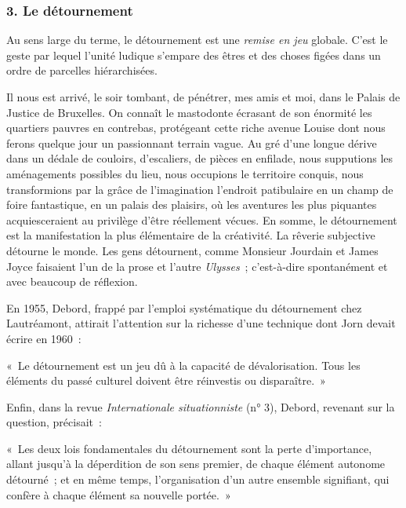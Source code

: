 \documentclass[french,twoside]{book} %
\newenvironment{quoteblock}%
  {\begin{quoting}}
  {\end{quoting}}
\newenvironment{quotebar}{%
    \def\FrameCommand{{\color{rubric!10!}\vrule width 0.5em} \hspace{0.9em}}%
    \def\OuterFrameSep{\itemsep} %
    \MakeFramed {\advance\hsize-\width \FrameRestore}
  }%
  {%
    \endMakeFramed
  }
\renewenvironment{quoteblock}%
  {%
    \savenotes
    \setstretch{0.9}
    \normalfont
    \begin{quotebar}
  }
  {%
    \end{quotebar}
    \spewnotes
  }
\begin{document}
\subsubsection[{3. Le détournement}]{\textsc{3. }Le détournement}
\noindent Au sens large du terme, le détournement est une \emph{remise en jeu} globale. C’est le geste par lequel l’unité ludique s’empare des êtres et des choses figées dans un ordre de parcelles hiérarchisées.\par
Il nous est arrivé, le soir tombant, de pénétrer, mes amis et moi, dans le Palais de Justice de Bruxelles. On connaît le mastodonte écrasant de son énormité les quartiers pauvres en contrebas, protégeant cette riche avenue Louise dont nous ferons quelque jour un passionnant terrain vague. Au gré d’une longue dérive dans un dédale de couloirs, d’escaliers, de pièces en enfilade, nous supputions les aménagements possibles du lieu, nous occupions le territoire conquis, nous transformions par la grâce de l’imagination l’endroit patibulaire en un champ de foire fantastique, en un palais des plaisirs, où les aventures les plus piquantes acquiesceraient au privilège d’être réellement vécues. En somme, le détournement est la manifestation la plus élémentaire de la créativité. La rêverie subjective détourne le monde. Les gens détournent, comme Monsieur Jourdain et James Joyce faisaient l’un de la prose et l’autre \emph{Ulysses} ; c’est-à-dire spontanément et avec beaucoup de réflexion.\par
En 1955, Debord, frappé par l’emploi systématique du détournement chez Lautréamont, attirait l’attention sur la richesse d’une technique dont Jorn devait écrire en 1960 :\par

\begin{quoteblock}
\noindent « Le détournement est un jeu dû à la capacité de dévalorisation. Tous les éléments du passé culturel doivent être réinvestis ou disparaître. »\end{quoteblock}

\noindent Enfin, dans la revue \emph{Internationale situationniste} (n° 3), Debord, revenant sur la question, précisait :\par

\begin{quoteblock}
\noindent « Les deux lois fondamentales du détournement sont la perte d’importance, allant jusqu’à la déperdition de son sens premier, de chaque élément autonome détourné ; et en même temps, l’organisation d’un autre ensemble signifiant, qui confère à chaque élément sa nouvelle portée. »\end{quoteblock}
\end{document}
